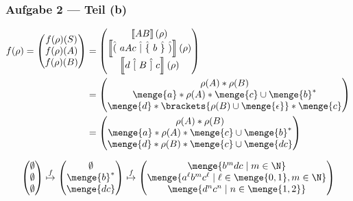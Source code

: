 \documentclass{beamer}
\newcommand{\wdh}[1]{\hat{\{} \ #1 \ \hat{\}}}
\newcommand{\opt}[2]{\hat{(} \ #1 \ \hat{|} \ #2 \ \hat{)}}
\newcommand{\byp}[1]{\hat{[} \ #1 \ \hat{]}}
\newcommand{\sem}[1]{\left\llbracket #1 \right\rrbracket}
\begin{document}
\begin{frame} \frametitle{Aufgabe 2 --- Teil (b)}
	\small
	\begin{align*}
		f(\rho) = \begin{pmatrix} f(\rho)(S) \\ f(\rho)(A) \\ f(\rho)(B) \end{pmatrix} 
		&= \begin{pmatrix} \sem{AB}(\rho) \\ \sem{\opt{aAc}{\wdh{b}}}(\rho) \\ \sem{d \ \byp{B} \ c}(\rho) \end{pmatrix} \\
		&= \begin{pmatrix}
			\rho(A) * \rho(B) \\ \menge{a} * \rho(A) * \menge{c} \cup \menge{b}^\ast \\ \menge{d} * \brackets{\rho(B) \cup \menge{\epsilon}} * \menge{c} \end{pmatrix} \\
		&= \begin{pmatrix}
			\rho(A) * \rho(B) \\ \menge{a} * \rho(A) * \menge{c} \cup \menge{b}^\ast \\ \menge{d} * \rho(B) * \menge{c} \cup \menge{dc} \end{pmatrix}
	\end{align*}
	
	\begin{align*}
		\begin{pmatrix} \emptyset \\ \emptyset \\ \emptyset \end{pmatrix}
		\overset{f}{\mapsto}
		\begin{pmatrix} \emptyset \\ \menge{b}^\ast \\ \menge{dc} \end{pmatrix}
		\overset{f}{\mapsto}
		\begin{pmatrix} \menge{b^m dc \mid m \in \N} \\ \menge{a^\ell b^m c^\ell \mid \ell \in \menge{0,1}, m \in \N} \\ \menge{d^n c^n \mid n \in \menge{1,2}} \end{pmatrix}
	\end{align*}
\end{frame}
\end{document}
